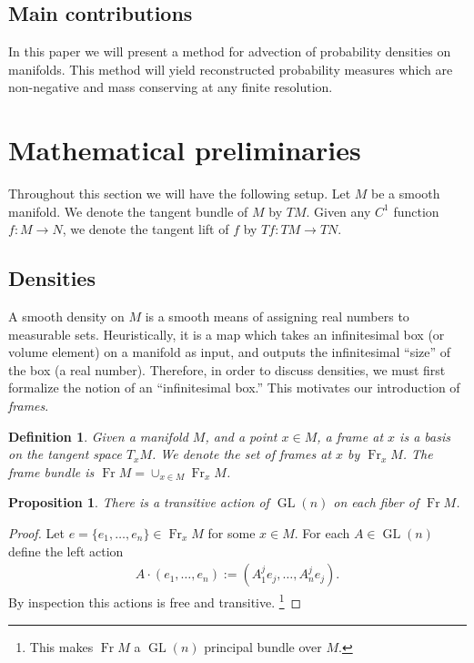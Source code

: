 \documentclass[letterpaper, 12 pt]{amsart}
\newtheorem{defn}[thm]{Definition}
\newtheorem{prop}[thm]{Proposition}
\DeclareMathOperator{\Fr}{Fr}
\DeclareMathOperator{\GL}{GL}
\begin{document}
\subsection{Main contributions}
  In this paper we will present a method for advection of
  probability densities on manifolds.
  This method will yield reconstructed probability measures
  which are non-negative and mass conserving at any finite resolution.

\section{Mathematical preliminaries}
\label{sec:math}
  Throughout this section we will have the following
  setup.  Let $M$ be a smooth manifold.
  We denote the tangent bundle of $M$ by $TM$.
  Given any $C^1$ function $f:M \to N$,
  we denote the tangent lift of $f$ by $Tf:TM \to TN$.

\subsection{Densities}
  A smooth density on $M$ is a smooth means of
  assigning real numbers to measurable sets.
  Heuristically, it is a map which
  takes an infinitesimal box (or volume element)
  on a manifold as input, and outputs the infinitesimal ``size''
  of the box (a real number).
  Therefore, in order to discuss densities,
  we must first formalize the notion of an ``infinitesimal box.''
  This motivates our introduction of \emph{frames}.
  \begin{defn}
  \label{eq:frame_bundle}
    Given a manifold $M$, and a point $x \in M$,
    a \emph{frame at $x$} is a basis on the tangent space $T_x M$.
    We denote the set of frames at $x$ by $\Fr_x M$.
    The frame bundle is $\Fr M = \cup_{x \in M} \Fr_x M$.
  \end{defn}

  \begin{prop}
    There is a transitive
    action of $\GL(n)$ on each fiber of $\Fr M$.
  \end{prop}

  \begin{proof}
    Let $e = \{ e_1,\dots,e_n \} \in \Fr_x M$ for some $x \in M$.
    For each $A \in \GL(n)$ define the left action
    \begin{align*}
      A \cdot (e_1,\dots,e_n) := (A^j_1 e_j , \dots, A_n^j e_j ). 
    \end{align*}
    By inspection this actions is free and transitive.
    \footnote{This makes $\Fr M$ a $\GL(n)$ principal bundle over $M$.}
  \end{proof}
\end{document}
